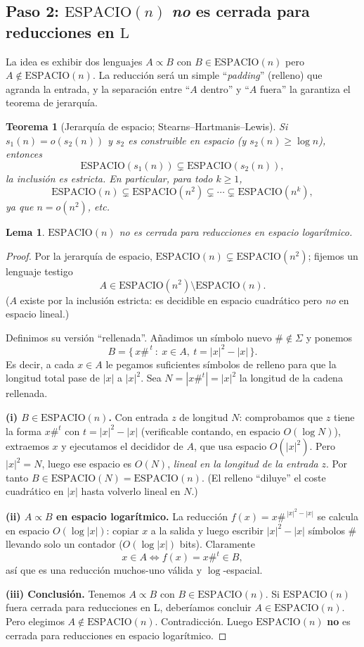 \documentclass[11pt,a4paper]{article}
\theoremstyle{plain}
\newtheorem{teorema}{Teorema}
\newtheorem{lema}{Lema}
\theoremstyle{definition}
\newcommand{\Lclass}{\mathrm{L}}
\newcommand{\SPACE}{\mathrm{ESPACIO}}
\newcommand{\reduce}{\propto}
\begin{document}
\subsection*{Paso 2: $\SPACE(n)$ \emph{no} es cerrada para reducciones en $\Lclass$}

La idea es exhibir dos lenguajes $A\reduce B$ con $B\in\SPACE(n)$ pero
$A\notin\SPACE(n)$. La reducci\'on ser\'a un simple ``\emph{padding}'' (relleno) que
agranda la entrada, y la separaci\'on entre ``$A$ dentro'' y ``$A$ fuera'' la
garantiza el teorema de jerarqu\'ia.

\begin{teorema}[Jerarqu\'ia de espacio; Stearns--Hartmanis--Lewis]
Si $s_1(n)=o(s_2(n))$ y $s_2$ es construible en espacio (y $s_2(n)\ge\log n$),
entonces
\[
\SPACE(s_1(n)) \subsetneq \SPACE(s_2(n)),
\]
la inclusi\'on es \emph{estricta}. En particular, para todo $k\ge 1$,
\[
\SPACE(n) \subsetneq \SPACE(n^{2})\subsetneq\cdots\subsetneq\SPACE(n^{k}),
\]
ya que $n = o(n^{2})$, etc.
\end{teorema}

\begin{lema}
$\SPACE(n)$ no es cerrada para reducciones en espacio logar\'itmico.
\end{lema}

\begin{proof}
Por la jerarqu\'ia de espacio, $\SPACE(n)\subsetneq\SPACE(n^{2})$; fijemos un lenguaje
testigo
\[
A\in\SPACE(n^{2})\setminus\SPACE(n) .
\]
($A$ existe por la inclusi\'on estricta: es decidible en espacio cuadr\'atico pero
\emph{no} en espacio lineal.)

Definimos su versi\'on ``rellenada''. A\~nadimos un s\'imbolo nuevo
$\#\notin\Sigma$ y ponemos
\[
B = \{\, x\#^{\,t} \ :\ x\in A,\ t = |x|^{2}-|x| \,\}.
\]
Es decir, a cada $x\in A$ le pegamos suficientes s\'imbolos de relleno para que la
longitud total pase de $|x|$ a $|x|^{2}$. Sea $N=|x\#^{t}|=|x|^{2}$ la longitud de la
cadena rellenada.

\textbf{(i) $B\in\SPACE(n)$.} Con entrada $z$ de longitud $N$: comprobamos que $z$
tiene la forma $x\#^{t}$ con $t=|x|^2-|x|$ (verificable contando, en espacio
$O(\log N)$), extraemos $x$ y ejecutamos el decididor de $A$, que usa espacio
$O(|x|^{2})$. Pero $|x|^{2}=N$, luego ese espacio es $O(N)$, \emph{lineal en la
longitud de la entrada} $z$. Por tanto $B\in\SPACE(N)=\SPACE(n)$. (El relleno
``diluye'' el coste cuadr\'atico en $|x|$ hasta volverlo lineal en $N$.)

\textbf{(ii) $A\reduce B$ en espacio logar\'itmico.} La reducci\'on
$f(x)=x\#^{\,|x|^{2}-|x|}$ se calcula en espacio $O(\log|x|)$: copiar $x$ a la salida
y luego escribir $|x|^{2}-|x|$ s\'imbolos $\#$ llevando solo un contador
($O(\log|x|)$ bits). Claramente
\[
x\in A \iff f(x)=x\#^{t}\in B,
\]
as\'i que es una reducci\'on muchos-uno v\'alida y $\log$-espacial.

\textbf{(iii) Conclusi\'on.} Tenemos $A\reduce B$ con $B\in\SPACE(n)$. Si
$\SPACE(n)$ fuera cerrada para reducciones en $\Lclass$, deber\'iamos concluir
$A\in\SPACE(n)$. Pero elegimos $A\notin\SPACE(n)$. Contradicci\'on. Luego
$\SPACE(n)$ \textbf{no} es cerrada para reducciones en espacio logar\'itmico.
\end{proof}
\end{document}
